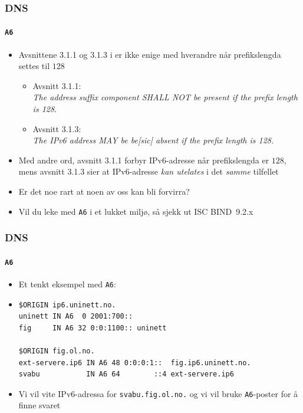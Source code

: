 \begin{frame}%
  \frametitle{DNS}
  \framesubtitle{\texttt{A6}}
  \begin{itemize}[<+->]
  \item Avsnittene 3.1.1 og 3.1.3 i  er ikke enige med
    hverandre når prefikslengda settes til \(128\)
    \begin{itemize}[<+->]
    \item Avsnitt 3.1.1:\\
      \textit{The address suffix component SHALL NOT be present if the prefix
      length is 128.\/}
  \item Avsnitt 3.1.3:\\
    \textit{The IPv6 address MAY be be\textnormal{[sic]} absent if the
      prefix length is 128.\/}
    \end{itemize}
  \item Med andre ord, avsnitt 3.1.1 forbyr IPv6-adresse når
    prefikslengda er \(128\), mens avsnitt 3.1.3 sier at IPv6-adresse
    \textit{kan utelates\/} i det \textit{samme\/} tilfellet
  \item Er det noe rart at noen av oss kan bli forvirra?
  \item Vil du leke med \texttt{A6} i et lukket miljø, så sjekk ut
    ISC BIND~9.2.x
  \end{itemize}
\end{frame}

\begin{frame}[fragile]%
  \frametitle{DNS}
  \framesubtitle{\texttt{A6}}
  \begin{itemize}[<+->]
  \item Et tenkt eksempel med \texttt{A6}:
  \item 
\begin{verbatim}
$ORIGIN ip6.uninett.no.
uninett IN A6  0 2001:700::
fig     IN A6 32 0:0:1100:: uninett

$ORIGIN fig.ol.no.
ext-servere.ip6 IN A6 48 0:0:0:1::  fig.ip6.uninett.no.
svabu           IN A6 64        ::4 ext-servere.ip6
\end{verbatim}
  \item Vi vil vite IPv6-adressa for \texttt{svabu.fig.ol.no.} og vi
    vil bruke \texttt{A6}-poster for å finne svaret
  \end{itemize}
\end{frame}

